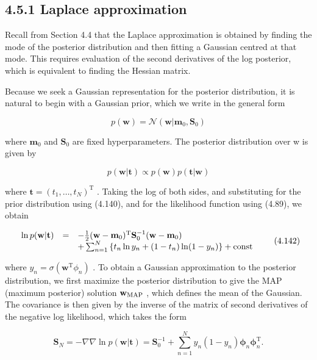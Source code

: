\documentclass[
  10
]{article}
\begin{document}
\subsection{4.5.1 Laplace approximation}\label{laplace-approximation}

Recall from Section 4.4 that the Laplace approximation is obtained by
finding the mode of the posterior distribution and then fitting a
Gaussian centred at that mode. This requires evaluation of the second
derivatives of the log posterior, which is equivalent to finding the
Hessian matrix.

Because we seek a Gaussian representation for the posterior
distribution, it is natural to begin with a Gaussian prior, which we
write in the general form

\[
p (\mathbf {w}) = \mathcal {N} (\mathbf {w} | \mathbf {m} _ {0}, \mathbf {S} _ {0})\tag{4.140}
\]

where \(\mathbf { m } _ { 0 }\) and \(\mathbf { S } _ { 0 }\) are fixed
hyperparameters. The posterior distribution over w is given by

\[
p (\mathbf {w} | \mathbf {t}) \propto p (\mathbf {w}) p (\mathbf {t} | \mathbf {w})\tag{4.141}
\]

where
\(\mathbf { t } = ( t _ { 1 } , \ldots , t _ { N } ) ^ { \mathrm { T } }\)
. Taking the log of both sides, and substituting for the prior
distribution using (4.140), and for the likelihood function using
(4.89), we obtain

\[
\begin{array}{r c l} \ln p (\mathbf {w} | \mathbf {t}) & = & - \frac {1}{2} (\mathbf {w} - \mathbf {m} _ {0}) ^ {\mathrm{T}} \mathbf {S} _ {0} ^ {- 1} (\mathbf {w} - \mathbf {m} _ {0}) \\ & & + \sum_ {n = 1} ^ {N} \left\{t _ {n} \ln y _ {n} + (1 - t _ {n}) \ln (1 - y _ {n}) \right\} + \text {const} \end{array}\tag{4.142}
\]

where
\(y _ { n } = \sigma ( \mathbf { w } ^ { \mathrm { T } } \phi _ { n } )\)
. To obtain a Gaussian approximation to the posterior distribution, we
first maximize the posterior distribution to give the MAP (maximum
posterior) solution \({ \bf w } _ { \mathrm { M A P } }\) , which
defines the mean of the Gaussian. The covariance is then given by the
inverse of the matrix of second derivatives of the negative log
likelihood, which takes the form

\[
\mathbf {S} _ {N} = - \nabla \nabla \ln p (\mathbf {w} | \mathbf {t}) = \mathbf {S} _ {0} ^ {- 1} + \sum_ {n = 1} ^ {N} y _ {n} (1 - y _ {n}) \boldsymbol {\phi} _ {n} \boldsymbol {\phi} _ {n} ^ {\mathrm{T}}.\tag{4.143}
\]
\end{document}
